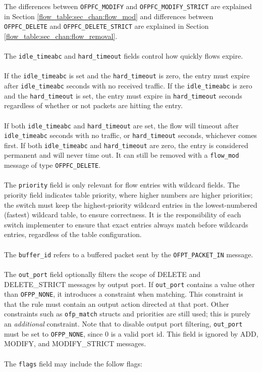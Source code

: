 
The differences between \verb|OFPFC_MODIFY| and \verb|OFPFC_MODIFY_STRICT| are explained in Section \ref{flow_table:sec_chan:flow_mod} and differences between \verb|OFPFC_DELETE| and \verb|OFPFC_DELETE_STRICT| are explained in Section \ref{flow_table:sec_chan:flow_removal}. 
\\\\
The \verb|idle_timeabc| and \verb|hard_timeout| fields control how quickly flows expire.  
\\\\
If the \verb|idle_timeabc| is set and the \verb|hard_timeout| is zero, the entry must expire after \verb|idle_timeabc| seconds with no received traffic.  If the \verb|idle_timeabc| is zero and the \verb|hard_timeout| is set, the entry must expire in \verb|hard_timeout| seconds regardless of whether or not packets are hitting the entry.
\\\\
If both \verb|idle_timeabc| and \verb|hard_timeout| are set, the flow will timeout after \verb|idle_timeabc| seconds with no traffic, or \verb|hard_timeout| seconds, whichever comes first.  If both \verb|idle_timeabc| and \verb|hard_timeout| are zero, the entry is considered permanent and will never time out.  It can still be removed with a \verb|flow_mod| message of type \verb|OFPFC_DELETE|. 
\\\\
The \verb|priority| field is only relevant for flow entries with wildcard fields.  The priority field indicates table priority, where higher numbers are higher priorities; the switch must keep the highest-priority wildcard entries in the lowest-numbered (fastest) wildcard table, to ensure correctness.  It is the responsibility of each switch implementer to ensure that exact entries always match before wildcards entries, regardless of the table configuration.  
\\\\
The \verb|buffer_id| refers to a buffered packet sent by the \verb|OFPT_PACKET_IN| message.
\\\\
The \verb|out_port| field optionally filters the scope of DELETE and DELETE\_STRICT messages by output port.  If \verb|out_port| contains a value other than \verb|OFPP_NONE|, it introduces a constraint when matching.  This constraint is that the rule must contain an output action directed at that port.  Other constraints such as \verb|ofp_match| structs and priorities are still used; this is purely an \emph{additional} constraint.  Note that to disable output port filtering, \verb|out_port| must be set to \verb|OFPP_NONE|, since 0 is a valid port id.  This field is ignored by ADD, MODIFY, and MODIFY\_STRICT messages.
\\\\
The \verb|flags| field may include the follow flags:


